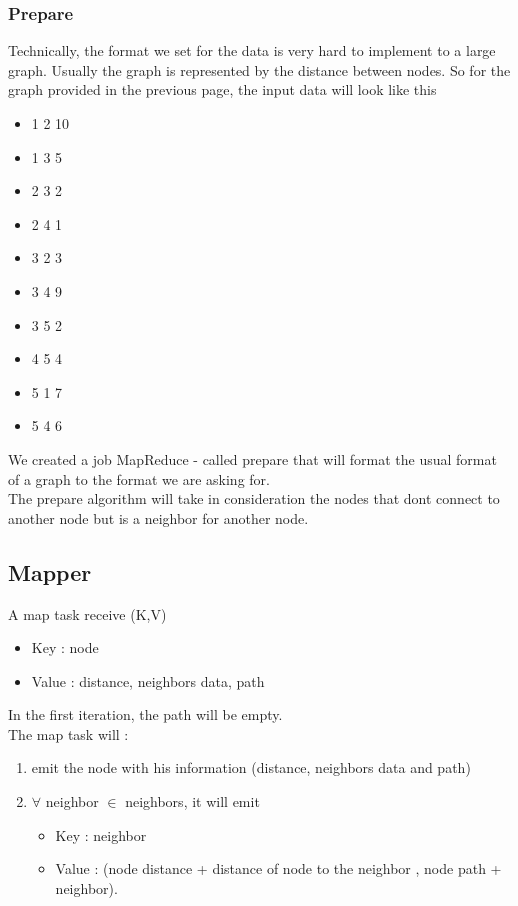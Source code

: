 \documentclass[english]{article}
\begin{document}
\subsubsection{Prepare}
Technically, the format we set for the data is very hard to implement to a large graph. Usually the graph is represented by the distance between nodes. So for the graph provided in the previous page, the input data will look like this 
\begin{itemize}
\item 1 2 10
\item 1 3 5
\item 2 3 2
\item 2 4 1
\item 3 2 3
\item 3 4 9
\item 3 5 2
\item 4 5 4
\item 5 1 7
\item 5 4 6
\end{itemize}
We created a job MapReduce - called prepare that will format the usual format of a graph to the format we are asking for.\\

The prepare algorithm will take in consideration the nodes that dont connect to another node but is a neighbor for another node.

\newpage
\subsection{Mapper}
A map task receive (K,V)
\begin{itemize}
\item Key : node
\item Value : distance, neighbors data, path
\end{itemize}
In the first iteration, the path will be empty. \\
The map task will : 
\begin{enumerate}
\item emit the node with his information (distance, neighbors data and path)
\item  $\forall$ neighbor $\in$ neighbors, it will emit 
	\begin{itemize}
	\item Key : neighbor
	\item Value : (node distance + distance of node to the neighbor , node path + neighbor).
	\end{itemize}
\end{enumerate}
\end{document}
